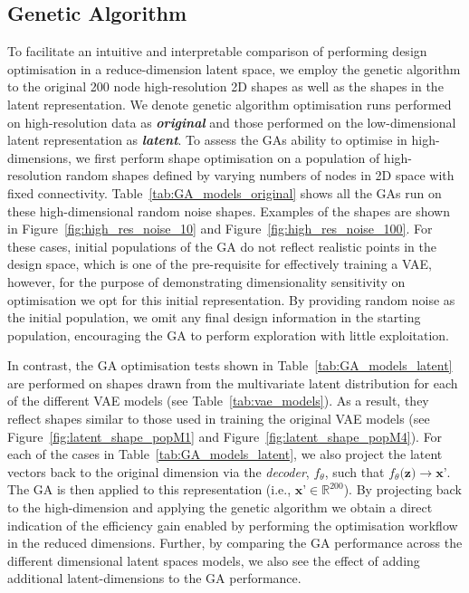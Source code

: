 \documentclass{article}
\begin{document}
\subsection{Genetic Algorithm}
To facilitate an intuitive and interpretable comparison of performing design optimisation in a reduce-dimension latent space, we employ the genetic algorithm to the original 200 node high-resolution 2D shapes as well as the shapes in the latent representation. We denote genetic algorithm optimisation runs performed on high-resolution data as \textbf{\textit{original}} and those performed on the low-dimensional latent representation as \textbf{\textit{latent}}. To assess the GAs ability to optimise in high-dimensions, we first perform shape optimisation on a population of high-resolution random shapes defined by varying numbers of nodes in 2D space with fixed connectivity. Table~\ref{tab:GA_models_original} shows all the GAs run on these high-dimensional random noise shapes. Examples of the shapes are shown in Figure~\ref{fig:high_res_noise_10} and Figure~\ref{fig:high_res_noise_100}. For these cases, initial populations of the GA do not reflect realistic points in the design space, which is one of the pre-requisite for effectively training a VAE, however, for the purpose of demonstrating dimensionality sensitivity on optimisation we opt for this initial representation. By providing random noise as the initial population, we omit any final design information in the starting population, encouraging the GA to perform exploration with little exploitation. 

In contrast, the GA optimisation tests shown in Table~\ref{tab:GA_models_latent} are performed on shapes drawn from the multivariate latent distribution for each of the different VAE models (see Table~\ref{tab:vae_models}). As a result, they reflect shapes similar to those used in training the original VAE models (see Figure~\ref{fig:latent_shape_popM1} and Figure~\ref{fig:latent_shape_popM4}). For each of the cases in Table~\ref{tab:GA_models_latent}, we also project the latent vectors back to the original dimension via the \textit{decoder}, $f_\theta$, such that $f_\theta(\textbf{z)}\rightarrow\textbf{x'}$. The GA is then applied to this representation  (i.e., $\textbf{x'}\in \mathbb{R}^{200}$). By projecting back to the high-dimension and applying the genetic algorithm we obtain a direct indication of the efficiency gain enabled by performing the optimisation workflow in the reduced dimensions. Further, by comparing the GA performance across the different dimensional latent spaces models, we also see the effect of adding additional latent-dimensions to the GA performance.
\end{document}
